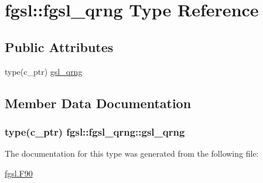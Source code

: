 \hypertarget{structfgsl_1_1fgsl__qrng}{}\section{fgsl\+:\+:fgsl\+\_\+qrng Type Reference}
\label{structfgsl_1_1fgsl__qrng}
\subsection*{Public Attributes}
\begin{DoxyCompactItemize}
\item 
type(c\+\_\+ptr) \hyperlink{structfgsl_1_1fgsl__qrng_a6d51d043c87751f28f580741aca6be6c}{gsl\+\_\+qrng}
\end{DoxyCompactItemize}


\subsection{Member Data Documentation}
\hypertarget{structfgsl_1_1fgsl__qrng_a6d51d043c87751f28f580741aca6be6c}{}
\subsubsection[{gsl\+\_\+qrng}]{\setlength{\rightskip}{0pt plus 5cm}type(c\+\_\+ptr) fgsl\+::fgsl\+\_\+qrng\+::gsl\+\_\+qrng}\label{structfgsl_1_1fgsl__qrng_a6d51d043c87751f28f580741aca6be6c}


The documentation for this type was generated from the following file\+:\begin{DoxyCompactItemize}
\item 
\hyperlink{fgsl_8F90}{fgsl.\+F90}\end{DoxyCompactItemize}
